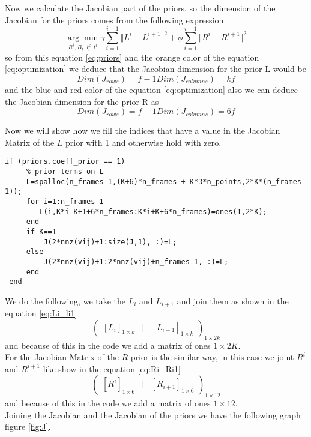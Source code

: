 \noindent Now we calculate the Jacobian part of the priors, so the dimension of the Jacobian for the priors comes from the following expression
\begin{equation}\label{eq:priors}
\underset{R^{i},B_{k},l_{i}^{k},t^{i}}{\arg\min}
\gamma\sum_{i=1}^{i-1}\Vert L^{i}-L^{i+1} \Vert^{2}+
\phi\sum_{i=1}^{i-1}\Vert R^{i}-R^{i+1} \Vert^{2}
\end{equation}
\noindent so from this equation \ref{eq:priors} and the orange color of the equation \ref{eq:optimization} we deduce that the Jacobian dimension for the prior L would be 
\begin{equation}
Dim(J_{rows})=f-1
Dim(J_{columns})=kf
\end{equation}
\noindent and the blue and red color of the equation \ref{eq:optimization} also we can deduce the Jacobian dimension for the prior R as
\begin{equation}
Dim(J_{rows})=f-1
Dim(J_{columns})=6f
\end{equation}

\noindent Now we will show how we fill the indices that have a value in the Jacobian Matrix of the $L$ prior with 1 and otherwise hold with zero.\\
\begin{lstlisting}[style=Matlab-editor]
if (priors.coeff_prior == 1)
     % prior terms on L
     L=spalloc(n_frames-1,(K+6)*n_frames + K*3*n_points,2*K*(n_frames-1));     
     for i=1:n_frames-1
        L(i,K*i-K+1+6*n_frames:K*i+K+6*n_frames)=ones(1,2*K);        
     end
     if K==1
         J(2*nnz(vij)+1:size(J,1), :)=L;
     else
         J(2*nnz(vij)+1:2*nnz(vij)+n_frames-1, :)=L;
     end
 end 
\end{lstlisting}
\noindent We do the following, we take the $L_{i}$ and $L_{i+1}$ and join them as shown in the equation \ref{eq:Li_li1}
\begin{equation}\label{eq:Li_li1}
\begin{pmatrix}
[L_{i}]_{1\times k} & | & [L_{i+1}]_{1\times k}
\end{pmatrix}_{1\times 2k}
\end{equation}
\noindent and because of this in the code we add a matrix of ones $1\times 2K$.\\
\noindent For the Jacobian Matrix of the $R$ prior is the similar way, in this case we joint $R^{i}$ and $R^{i+1}$ like show in the equation \ref{eq:Ri_Ri1}
\begin{equation}\label{eq:Ri_Ri1}
\begin{pmatrix}
[R^{i}]_{1\times 6} & | & [R_{i+1}]_{1\times 6}
\end{pmatrix}_{1\times 12}
\end{equation}
\noindent and because of this in the code we add a matrix of ones $1\times 12$.\\
Joining the Jacobian and the Jacobian of the priors we have the following graph figure \ref{fig:J}.

